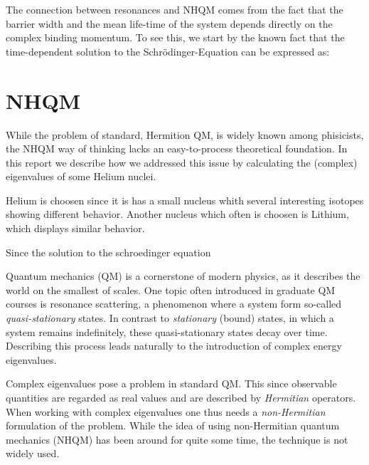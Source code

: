 The connection between resonances and NHQM comes from the fact that the barrier width and the mean life-time of the system depends directly on the complex binding momentum.
To see this, we start by the known fact that the time-dependent solution to the Schrödinger-Equation can be expressed as:



\section{NHQM}
While the problem of standard, Hermition QM, is widely known among phisicists, the NHQM way of thinking lacks an easy-to-process theoretical foundation.
In this report we describe how we addressed this issue by calculating the (complex) eigenvalues of some Helium nuclei.

Helium is choosen since it is has a small nucleus whith several interesting isotopes showing different behavior.
Another nucleus which often is choosen is Lithium, which displays similar behavior.

Since the solution to the schroedinger equation 








Quantum mechanics (QM) is a cornerstone of modern physics, as it describes the world on the smallest of scales.
One topic often introduced in graduate QM courses is resonance scattering, a phenomenon where a system form so-called \emph{quasi-stationary} states.
In contrast to \emph{stationary} (bound) states, in which a system remains indefinitely, these quasi-stationary states decay over time.
Describing this process leads naturally to the introduction of complex energy eigenvalues. 

Complex eigenvalues pose a problem in standard QM.
This since observable quantities are regarded as real values and are described by \emph{Hermitian} operators.
When working with complex eigenvalues one thus needs a \emph{non-Hermitian} formulation of the problem.
While the idea of using non-Hermitian quantum mechanics (NHQM) has been around for quite some time, the technique is not widely used.